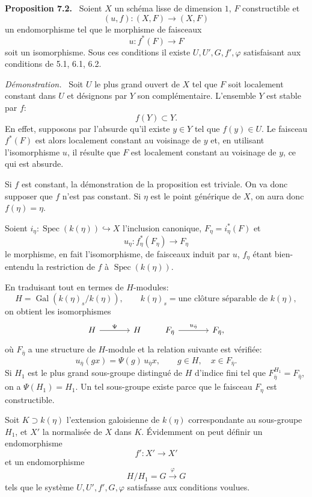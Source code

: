 \documentclass[11pt]{article}
\newenvironment{statement}[1]{\par\medskip\noindent\textbf{#1.}\ }{\par\medskip}
\newenvironment{prooftext}[1][Proof]{\par\noindent\emph{#1.}\ }{\par\medskip}
\DeclareMathOperator{\Spec}{Spec}
\providecommand{\Gal}{\operatorname{Gal}}
\providecommand{\Spec}{\operatorname{Spec}}
\providecommand{\Spec}{\operatorname{Spec}}
\providecommand{\Spec}{\operatorname{Spec}}
\providecommand{\Spec}{\operatorname{Spec}}
\providecommand{\Gal}{\operatorname{Gal}}
\begin{document}
\begin{statement}{Proposition 7.2}
Soient $X$ un schéma lisse de dimension $1$, $F$ constructible et
\[
(u,f):(X,F)\longrightarrow (X,F)
\]
un endomorphisme tel que le morphisme de faisceaux
\[
u:f^*(F)\longrightarrow F
\]
soit un isomorphisme. Sous ces conditions il existe $U,U',G,f',\varphi$ satisfaisant aux conditions de 5.1, 6.1, 6.2.
\end{statement}

\begin{prooftext}[Démonstration]
Soit $U$ le plus grand ouvert de $X$ tel que $F$ soit localement constant dans $U$ et désignons par $Y$ son complémentaire. L'ensemble $Y$ est stable par $f$:
\[
f(Y)\subset Y.
\]
En effet, supposons par l'absurde qu'il existe $y\in Y$ tel que $f(y)\in U$. Le faisceau $f^*(F)$ est alors localement constant au voisinage de $y$ et, en utilisant l'isomorphisme $u$, il résulte que $F$ est localement constant au voisinage de $y$, ce qui est absurde.

Si $f$ est constant, la démonstration de la proposition est triviale. On va donc supposer que $f$ n'est pas constant. Si $\eta$ est le point générique de $X$, on aura donc $f(\eta)=\eta$.

Soient $i_\eta:\Spec(k(\eta))\hookrightarrow X$ l'inclusion canonique, $F_\eta=i_\eta^*(F)$ et
\[
u_\eta:f_\eta^*(F_\eta)\longrightarrow F_\eta
\]
le morphisme, en fait l'isomorphisme, de faisceaux induit par $u$, $f_\eta$ étant bien-entendu la restriction de $f$ à $\Spec(k(\eta))$.

En traduisant tout en termes de $H$-modules:
\[
H=\Gal(k(\eta)_s/k(\eta)),\qquad k(\eta)_s=\text{une clôture séparable de }k(\eta),
\]
on obtient les isomorphismes
\[
\begin{tikzcd}[column sep=large]
H \arrow[r,"\Psi"] & H
\end{tikzcd}
\qquad
\begin{tikzcd}[column sep=large]
F_{\bar\eta} \arrow[r,"u_{\bar\eta}"] & F_{\bar\eta},
\end{tikzcd}
\]
où $F_{\bar\eta}$ a une structure de $H$-module et la relation suivante est vérifiée:
\[
u_{\bar\eta}(gx)=\Psi(g)\,u_{\bar\eta} x,
\qquad g\in H,
\quad x\in F_{\bar\eta}.
\]
Si $H_1$ est le plus grand sous-groupe distingué de $H$ d'indice fini tel que $F_{\bar\eta}^{H_1}=F_{\bar\eta}$, on a $\Psi(H_1)=H_1$. Un tel sous-groupe existe parce que le faisceau $F_\eta$ est constructible.

Soit $K\supset k(\eta)$ l'extension galoisienne de $k(\eta)$ correspondante au sous-groupe $H_1$, et $X'$ la normalisée de $X$ dans $K$. Évidemment on peut définir un endomorphisme
\[
f':X'\longrightarrow X'
\]
et un endomorphisme
\[
H/H_1=G\xrightarrow{\varphi}G
\]
tels que le système $U,U',f',G,\varphi$ satisfasse aux conditions voulues.
\end{prooftext}
\end{document}
